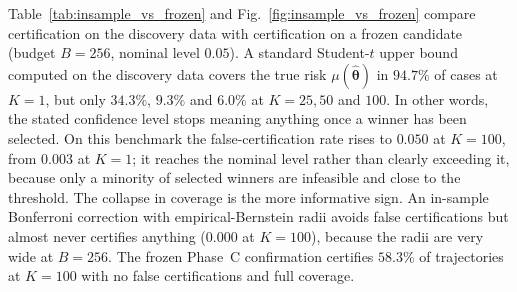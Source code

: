 \documentclass[a4paper,onecolumn,unpublished]{quantumarticle}
\newcommand{\thhat}{\widehat{\bm{\theta}}}
\begin{document}
Table~\ref{tab:insample_vs_frozen} and Fig.~\ref{fig:insample_vs_frozen} compare certification on the discovery data with certification on a frozen candidate (budget $B = 256$, nominal level $0.05$). A standard Student-$t$ upper bound computed on the discovery data covers the true risk $\mu(\thhat)$ in $94.7\%$ of cases at $K = 1$, but only $34.3\%$, $9.3\%$ and $6.0\%$ at $K = 25, 50$ and $100$. In other words, the stated confidence level stops meaning anything once a winner has been selected. On this benchmark the false-certification rate rises to $0.050$ at $K = 100$, from $0.003$ at $K = 1$; it reaches the nominal level rather than clearly exceeding it, because only a minority of selected winners are infeasible and close to the threshold. The collapse in coverage is the more informative sign. An in-sample Bonferroni correction with empirical-Bernstein radii avoids false certifications but almost never certifies anything ($0.000$ at $K = 100$), because the radii are very wide at $B = 256$. The frozen Phase~C confirmation certifies $58.3\%$ of trajectories at $K = 100$ with no false certifications and full coverage.
\end{document}
